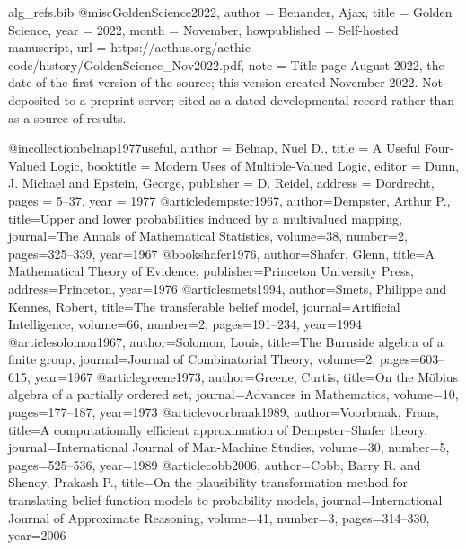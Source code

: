 \begin{filecontents}[overwrite]{alg_refs.bib}
@misc{GoldenScience2022,
  author       = {Benander, Ajax},
  title        = {Golden Science},
  year         = {2022},
  month        = {November},
  howpublished = {Self-hosted manuscript},
  url          = {https://aethus.org/aethic-code/history/GoldenScience_Nov2022.pdf},
  note         = {Title page August 2022, the date of the first version of the source; this version created November 2022. Not deposited to a
                  preprint server; cited as a dated developmental record rather than
                  as a source of results.}
}

@incollection{belnap1977useful,
  author = {Belnap, Nuel D.},
  title = {A Useful Four-Valued Logic},
  booktitle = {Modern Uses of Multiple-Valued Logic},
  editor = {Dunn, J. Michael and Epstein, George},
  publisher = {D. Reidel}, address = {Dordrecht}, pages = {5--37}, year = {1977}}
@article{dempster1967, author={Dempster, Arthur P.}, title={Upper and lower probabilities induced by a multivalued mapping}, journal={The Annals of Mathematical Statistics}, volume={38}, number={2}, pages={325--339}, year={1967}}
@book{shafer1976, author={Shafer, Glenn}, title={A Mathematical Theory of Evidence}, publisher={Princeton University Press}, address={Princeton}, year={1976}}
@article{smets1994, author={Smets, Philippe and Kennes, Robert}, title={The transferable belief model}, journal={Artificial Intelligence}, volume={66}, number={2}, pages={191--234}, year={1994}}
@article{solomon1967, author={Solomon, Louis}, title={The {Burnside} algebra of a finite group}, journal={Journal of Combinatorial Theory}, volume={2}, pages={603--615}, year={1967}}
@article{greene1973, author={Greene, Curtis}, title={On the {M}{\"o}bius algebra of a partially ordered set}, journal={Advances in Mathematics}, volume={10}, pages={177--187}, year={1973}}
@article{voorbraak1989, author={Voorbraak, Frans}, title={A computationally efficient approximation of {Dempster--Shafer} theory}, journal={International Journal of Man-Machine Studies}, volume={30}, number={5}, pages={525--536}, year={1989}}
@article{cobb2006, author={Cobb, Barry R. and Shenoy, Prakash P.}, title={On the plausibility transformation method for translating belief function models to probability models}, journal={International Journal of Approximate Reasoning}, volume={41}, number={3}, pages={314--330}, year={2006}}

\end{filecontents}
